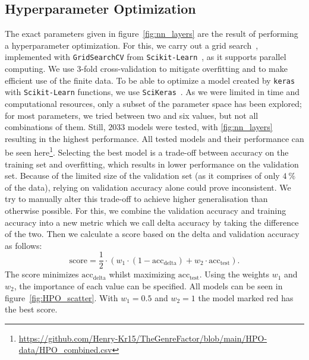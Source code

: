 \documentclass[
  12pt,
  bibliography=totoc,     %
  captions=tableheading,  %
  titlepage=firstiscover, %
]{scrartcl}
\begin{document}
\subsection{Hyperparameter Optimization}
The exact parameters given in figure~\ref{fig:nn_layers} are the result of performing a hyperparameter optimization. For this, we carry out a
grid search~\cite{gridsearch}, implemented with \texttt{GridSearchCV} from \texttt{Scikit-Learn}~\cite{scikit-learn}, as it supports parallel computing.
We use $3$-fold cross-validation  to mitigate overfitting and to make efficient use of the finite data.
To be able to optimize a model created by \texttt{keras} with \texttt{Scikit-Learn} functions, we use \texttt{SciKeras}~\cite{scikeras}. As we were limited in time and
computational resources, only a subset of the parameter space has been explored; for most parameters, we tried between two and six values, but
not all combinations of them. Still, $2033$ models were tested, with \ref{fig:nn_layers} resulting in the highest performance. All tested models and their performance can be
seen here\footnote{\url{https://github.com/Henry-Kr15/TheGenreFactor/blob/main/HPO-data/HPO_combined.csv}}.
Selecting the best model is a trade-off between accuracy on the training set and overfitting, which results in lower performance on the validation set. Because of the limited
size of the validation set (as it comprises of only $\SI{4}{\percent}$ of the data), relying on validation accuracy alone could prove inconsistent. We try to manually alter
this trade-off to achieve higher generalisation than otherwise possible. For this, we combine the validation accuracy and training accuracy into a new metric which we call
delta accuracy by taking the difference of the two. Then we calculate a score based on the delta and validation accuracy as follows:
\begin{equation}
	\text{score} = \frac{1}{2} \cdot (w_{1} \cdot (1 - \text{acc}_{\text{delta}}) + w_{2} \cdot \text{acc}_{\text{test}}).
  \label{eqn:score}
\end{equation}
The score minimizes $\text{acc}_{\text{delta}}$ whilst maximizing $\text{acc}_{\text{test}}$. Using the weights $w_{1}$ and $w_{2}$, the importance of each value can be specified.
All models can be seen in figure~\ref{fig:HPO_scatter}. With $w_{1}=0.5$ and $w_{2}=1$ the model marked red has the best score.
\end{document}
